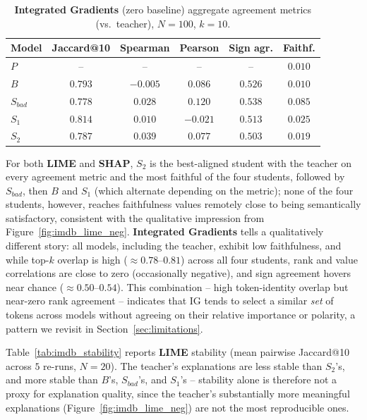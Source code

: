 \documentclass[conference]{IEEEtran}
\begin{document}
\begin{table}[h!]
\centering
\caption{\textbf{Integrated Gradients} (zero baseline) aggregate agreement metrics (vs.\ teacher), $N=100$, $k=10$.}
\footnotesize
\begin{tabular}{|l|c|c|c|c|c|}
\hline
Model & Jaccard@10 & Spearman & Pearson & Sign agr. & Faithf. \\ \hline
$P$ & -- & -- & -- & -- & $0.010$ \\
$B$ & $0.793$ & $-0.005$ & $0.086$ & $0.526$ & $0.010$ \\
$S_{bad}$ & $0.778$ & $0.028$ & $0.120$ & $0.538$ & $0.085$ \\
$S_1$ & $0.814$ & $0.010$ & $-0.021$ & $0.513$ & $0.025$ \\
$S_2$ & $0.787$ & $0.039$ & $0.077$ & $0.503$ & $0.019$ \\ \hline
\end{tabular}
\label{tab:imdb_ig_agg}
\end{table}

For both \textbf{LIME} and \textbf{SHAP}, $S_2$ is the best-aligned student with the teacher on every agreement metric and the most faithful of the four students, followed by $S_{bad}$, then $B$ and $S_1$ (which alternate depending on the metric); none of the four students, however, reaches faithfulness values remotely close to being semantically satisfactory, consistent with the qualitative impression from Figure~\ref{fig:imdb_lime_neg}. \textbf{Integrated Gradients} tells a qualitatively different story: all models, including the teacher, exhibit low faithfulness, and while top-$k$ overlap is high ($\approx0.78$--$0.81$) across all four students, rank and value correlations are close to zero (occasionally negative), and sign agreement hovers near chance ($\approx0.50$--$0.54$). This combination -- high token-identity overlap but near-zero rank agreement -- indicates that IG tends to select a similar \emph{set} of tokens across models without agreeing on their relative importance or polarity, a pattern we revisit in Section~\ref{sec:limitations}.

Table~\ref{tab:imdb_stability} reports \textbf{LIME} stability (mean pairwise Jaccard@10 across $5$ re-runs, $N=20$). The teacher's explanations are less stable than $S_2$'s, and more stable than $B$'s, $S_{bad}$'s, and $S_1$'s -- stability alone is therefore not a proxy for explanation quality, since the teacher's substantially more meaningful explanations (Figure~\ref{fig:imdb_lime_neg}) are not the most reproducible ones.
\end{document}
